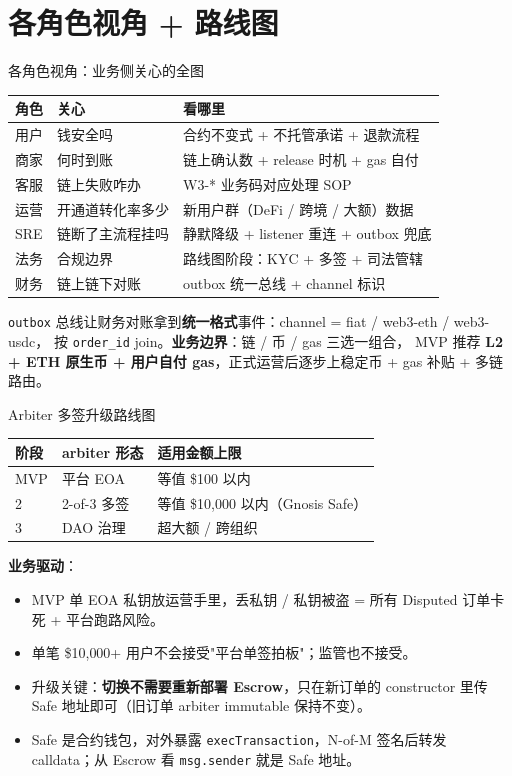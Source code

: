 \documentclass[aspectratio=169,11pt]{beamer}
\begin{document}
\section{各角色视角 + 路线图}

\begin{frame}[shrink]{各角色视角：业务侧关心的全图}
\begin{tabular}{@{}lll@{}}
\toprule
角色   & 关心               & 看哪里 \\
\midrule
用户   & 钱安全吗            & 合约不变式 + 不托管承诺 + 退款流程 \\
商家   & 何时到账            & 链上确认数 + release 时机 + gas 自付 \\
客服   & 链上失败咋办        & W3-* 业务码对应处理 SOP \\
运营   & 开通道转化率多少    & 新用户群（DeFi / 跨境 / 大额）数据 \\
SRE    & 链断了主流程挂吗    & 静默降级 + listener 重连 + outbox 兜底 \\
法务   & 合规边界            & 路线图阶段：KYC + 多签 + 司法管辖 \\
财务   & 链上链下对账        & outbox 统一总线 + channel 标识 \\
\bottomrule
\end{tabular}
\vspace{2mm}
\small \texttt{outbox} 总线让财务对账拿到\textbf{统一格式}事件：channel = fiat / web3-eth / web3-usdc，
按 \texttt{order\_id} join。\textbf{业务边界}：链 / 币 / gas 三选一组合，
MVP 推荐 \textbf{L2 + ETH 原生币 + 用户自付 gas}，正式运营后逐步上稳定币 + gas 补贴 + 多链路由。
\end{frame}

\begin{frame}[shrink]{Arbiter 多签升级路线图}
\begin{tabular}{@{}lll@{}}
\toprule
阶段 & arbiter 形态  & 适用金额上限 \\
\midrule
MVP  & 平台 EOA     & 等值 \$100 以内 \\
2    & 2-of-3 多签  & 等值 \$10{,}000 以内（Gnosis Safe） \\
3    & DAO 治理     & 超大额 / 跨组织 \\
\bottomrule
\end{tabular}
\vspace{2mm}
\textbf{业务驱动}：
\begin{itemize}
  \item MVP 单 EOA 私钥放运营手里，丢私钥 / 私钥被盗 = 所有 Disputed 订单卡死 + 平台跑路风险。
  \item 单笔 \$10{,}000+ 用户不会接受"平台单签拍板"；监管也不接受。
  \item 升级关键：\textbf{切换不需要重新部署 Escrow}，只在新订单的 constructor 里传 Safe 地址即可（旧订单 arbiter immutable 保持不变）。
  \item Safe 是合约钱包，对外暴露 \texttt{execTransaction}，N-of-M 签名后转发 calldata；从 Escrow 看 \texttt{msg.sender} 就是 Safe 地址。
\end{itemize}
\end{frame}
\end{document}
